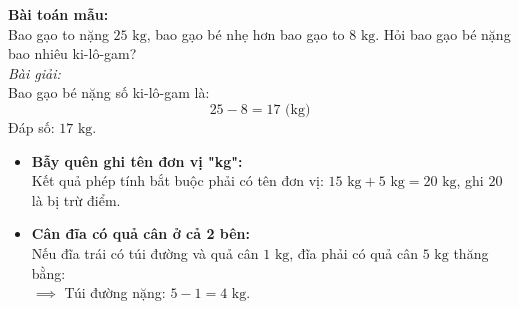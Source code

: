 \documentclass[11pt,a4paper]{article}
\begin{document}
\vspace{-1.5mm}
\noindent
\begin{minipage}[t]{0.49\textwidth}\vspace{0pt}
\begin{tcolorbox}[
  enhanced,
  colback=green!4!white,
  colframe=green!60!black,
  arc=2mm, boxrule=0.8pt,
  left=2mm, right=2mm, top=1.8mm, bottom=1.8mm,
  title={\footnotesize\bfseries\color{white}\faCheckCircle\ 4. Ví dụ thực hành chuẩn mực}
]
{\footnotesize
\textbf{Bài toán mẫu:}\\
Bao gạo to nặng $25\text{ kg}$, bao gạo bé nhẹ hơn bao gạo to $8\text{ kg}$. Hỏi bao gạo bé nặng bao nhiêu ki-lô-gam?\\
\textit{Bài giải:}\\
Bao gạo bé nặng số ki-lô-gam là:
$$25 - 8 = 17\text{ (kg)}$$
Đáp số: $17\text{ kg}$.
}
\end{tcolorbox}
\end{minipage}
\hfill
\begin{minipage}[t]{0.49\textwidth}\vspace{0pt}
\begin{tcolorbox}[
  enhanced,
  colback=red!4!white,
  colframe=red!75!black,
  arc=2mm, boxrule=0.8pt,
  left=2mm, right=2mm, top=1.8mm, bottom=1.8mm,
  title={\footnotesize\bfseries\color{white}\faExclamationTriangle\ 5. Mẹo tránh bẫy trắc nghiệm}
]
{\footnotesize
\begin{itemize}\setlength{\itemsep}{1pt}\setlength{\leftskip}{-2.5mm}
  \item \textbf{Bẫy quên ghi tên đơn vị "kg":}\\
  Kết quả phép tính bắt buộc phải có tên đơn vị: $15\text{ kg} + 5\text{ kg} = 20\text{ kg}$, ghi $20$ là bị trừ điểm.
  \item \textbf{Cân đĩa có quả cân ở cả 2 bên:}\\
  Nếu đĩa trái có túi đường và quả cân $1\text{ kg}$, đĩa phải có quả cân $5\text{ kg}$ thăng bằng:\\
  $\implies$ Túi đường nặng: $5 - 1 = 4\text{ kg}$.
\end{itemize}
}
\end{tcolorbox}
\end{minipage}
\end{document}
